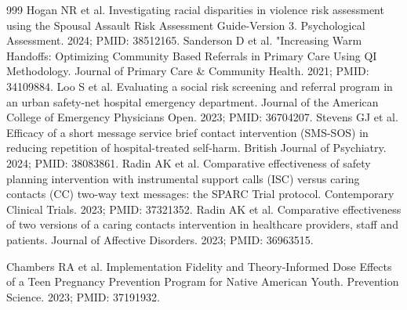 \begin{thebibliography}{999}
 Hogan NR et al. Investigating racial disparities in violence risk assessment using the Spousal Assault Risk Assessment Guide-Version 3. Psychological Assessment. 2024; PMID: 38512165.
 Sanderson D et al. "Increasing Warm Handoffs: Optimizing Community Based Referrals in Primary Care Using QI Methodology. Journal of Primary Care \& Community Health. 2021; PMID: 34109884.
 Loo S et al. Evaluating a social risk screening and referral program in an urban safety-net hospital emergency department. Journal of the American College of Emergency Physicians Open. 2023; PMID: 36704207.
 Stevens GJ et al. Efficacy of a short message service brief contact intervention (SMS-SOS) in reducing repetition of hospital-treated self-harm. British Journal of Psychiatry. 2024; PMID: 38083861.
 Radin AK et al. Comparative effectiveness of safety planning intervention with instrumental support calls (ISC) versus caring contacts (CC) two-way text messages: the SPARC Trial protocol. Contemporary Clinical Trials. 2023; PMID: 37321352.
 Radin AK et al. Comparative effectiveness of two versions of a caring contacts intervention in healthcare providers, staff and patients. Journal of Affective Disorders. 2023; PMID: 36963515.

 Chambers RA et al. Implementation Fidelity and Theory-Informed Dose Effects of a Teen Pregnancy Prevention Program for Native American Youth. Prevention Science. 2023; PMID: 37191932.


\end{thebibliography}
